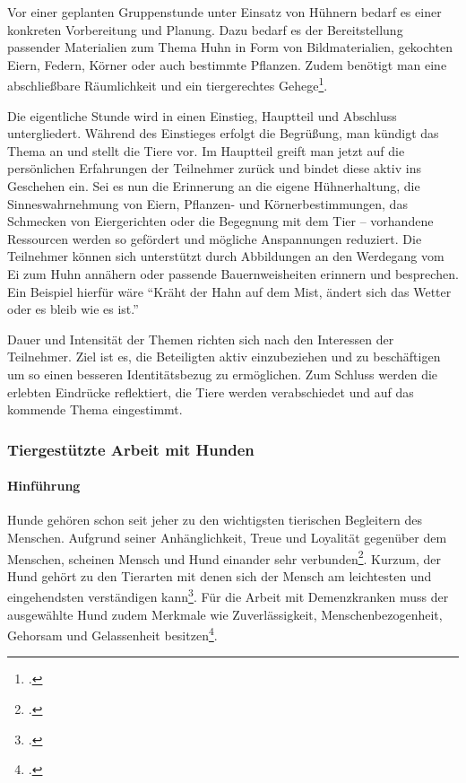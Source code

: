 Vor einer geplanten Gruppenstunde unter Einsatz von Hühnern bedarf es einer konkreten Vorbereitung und Planung. Dazu bedarf es der Bereitstellung passender Materialien zum Thema Huhn in Form von Bildmaterialien, gekochten Eiern, Federn, Körner oder auch bestimmte Pflanzen. Zudem benötigt man eine abschließbare Räumlichkeit und ein tiergerechtes Gehege\footcite[61-67]{Giruc2011}. 

Die eigentliche Stunde wird in einen Einstieg, Hauptteil und Abschluss untergliedert. Während des Einstieges erfolgt die Begrüßung, man kündigt das Thema an und stellt die Tiere vor. Im Hauptteil greift man jetzt auf die persönlichen Erfahrungen der Teilnehmer zurück und bindet diese aktiv ins Geschehen ein. Sei es nun die Erinnerung an die eigene Hühnerhaltung, die Sinneswahrnehmung von Eiern, Pflanzen- und Körnerbestimmungen, das Schmecken von Eiergerichten oder die Begegnung mit dem Tier -- vorhandene Ressourcen werden so gefördert und mögliche Anspannungen reduziert. Die Teilnehmer können sich unterstützt durch Abbildungen an den Werdegang vom Ei zum Huhn annähern oder passende Bauernweisheiten erinnern und besprechen. Ein Beispiel hierfür wäre "`Kräht der Hahn auf dem Mist, ändert sich das Wetter oder es bleib wie es ist."' 

Dauer und Intensität der Themen richten sich nach den Interessen der Teilnehmer. Ziel ist es, die Beteiligten aktiv einzubeziehen und zu beschäftigen um so einen besseren Identitätsbezug zu ermöglichen. Zum Schluss werden die erlebten Eindrücke reflektiert, die Tiere werden verabschiedet und auf das kommende Thema eingestimmt.

\subsubsection{Tiergestützte Arbeit mit Hunden}
\label{sec:k4.3.2_TiergestützteArbeitMitHunden}

\paragraph{Hinführung}
\label{sec:k4.3.2.1_Hinfuehrung}

Hunde gehören schon seit jeher zu den wichtigsten tierischen Begleitern des Menschen. Aufgrund seiner Anhänglichkeit, Treue und Loyalität gegenüber dem Menschen, scheinen Mensch und Hund einander sehr verbunden\footcite[92]{Ochsenbein2005}. Kurzum, der Hund gehört zu den Tierarten mit denen sich der Mensch am leichtesten und eingehendsten verständigen kann\footcite[95]{Ochsenbein2005}. Für die Arbeit mit Demenzkranken muss der ausgewählte Hund zudem Merkmale wie Zuverlässigkeit, Menschenbezogenheit, Gehorsam und Gelassenheit besitzen\footcite[42]{Giruc2011}.

